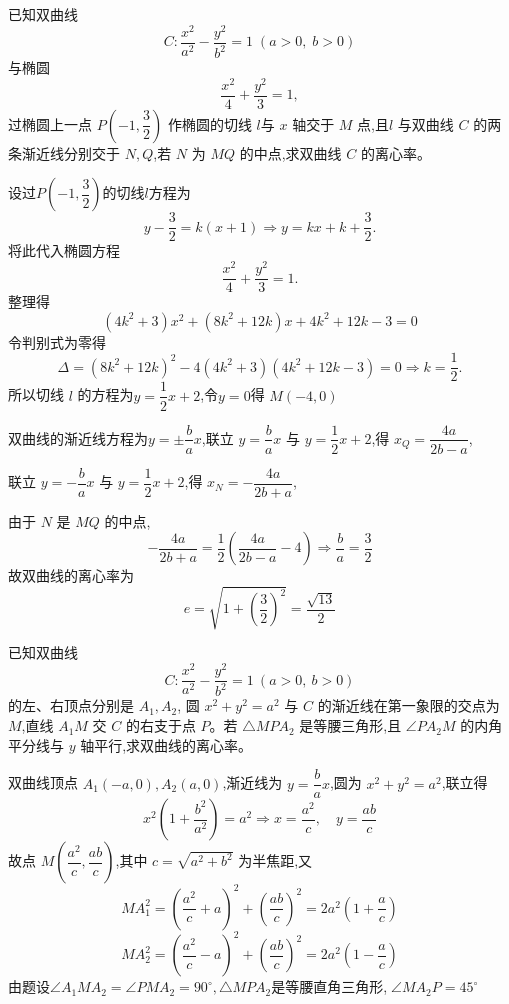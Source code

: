 \begin{questions}
    \question 已知双曲线 
    \[
    C: \frac{x^{2}}{a^{2}} - \frac{y^{2}}{b^{2}} = 1 \; (a>0,\; b>0)
    \]
    与椭圆
    \[
    \frac{x^{2}}{4} + \frac{y^{2}}{3} = 1,
    \]
    过椭圆上一点 $P\left(-1,\dfrac{3}{2}\right)$ 作椭圆的切线 $l$与 $x$ 轴交于 $M$ 点,且$l$ 与双曲线 $C$ 的两条渐近线分别交于 $N,Q$,若 $N$ 为 $MQ$ 的中点,求双曲线 $C$ 的离心率。
    \begin{solution}
        设过$P(-1,\dfrac{3}{2})$的切线$l$方程为
        \[
        y - \frac{3}{2} = k(x + 1)
        \Rightarrow y = kx + k + \frac{3}{2}.
        \]
        将此代入椭圆方程
        \[
        \frac{x^{2}}{4} + \frac{y^{2}}{3} = 1.
        \]
        整理得
        \[
        (4k^2+3)x^2+(8k^2+12k)x+4k^2+12k-3=0
        \]
        令判别式为零得
        \[
        \Delta = (8k^2+12k)^2-4(4k^2+3)(4k^2+12k-3)=0\Rightarrow k = \frac{1}{2}.
        \]
        所以切线 $l$ 的方程为$y = \dfrac{1}{2}x + 2$,令$y = 0$得 $M(-4, 0)$
        
        双曲线的渐近线方程为$y = \pm \dfrac{b}{a}x$,联立 $y = \dfrac{b}{a}x$ 与 $y = \dfrac{1}{2}x + 2$,得 $x_Q = \dfrac{4a}{2b - a}$,
        
        联立 $y = -\dfrac{b}{a}x$ 与 $y = \dfrac{1}{2}x + 2$,得
        $x_N = -\dfrac{4a}{2b + a}$,
        
        由于 $N$ 是 $MQ$ 的中点,
        \[
        -\frac{4a}{2b + a} = \frac{1}{2} \left( \frac{4a}{2b - a} - 4 \right) \Rightarrow\frac{b}{a} = \frac{3}{2}
        \]
        故双曲线的离心率为
        \[
        e = \sqrt{1 + \left( \frac{3}{2} \right)^2 } = \frac{\sqrt{13}}{2}
        \]
    \end{solution}

    \question 已知双曲线 
    \[
    C:\dfrac{x^{2}}{a^{2}} - \dfrac{y^{2}}{b^{2}} = 1\ (a>0,\ b>0)
    \]
    的左、右顶点分别是 $A_1,A_2$,  圆 $x^2 + y^2 = a^2$ 与 $C$ 的渐近线在第一象限的交点为 $M$,直线 $A_1M$ 交 $C$ 的右支于点 $P$。若 $\triangle MPA_2$ 是等腰三角形,且 $\angle PA_2M$ 的内角平分线与 $y$ 轴平行,求双曲线的离心率。
    \begin{solution}
        双曲线顶点 $A_1(-a, 0), A_2(a, 0)$,渐近线为 $y = \dfrac{b}{a}x$,圆为 $x^2 + y^2 = a^2$,联立得
        \[
        x^2\left(1 + \frac{b^2}{a^2}\right) = a^2 \Rightarrow x = \frac{a^2}{c}, \quad y = \frac{ab}{c}
        \]
        故点 $M\left( \dfrac{a^2}{c}, \dfrac{ab}{c} \right)$,其中 $c = \sqrt{a^2 + b^2}$ 为半焦距,又
        \[
        MA_1^2 = \left(\frac{a^2}{c} + a\right)^2 + \left( \frac{ab}{c} \right)^2 = 2a^2\left(1 + \frac{a}{c}\right)
        \]
        \[
        MA_2^2 = \left(\frac{a^2}{c} - a\right)^2 + \left( \frac{ab}{c} \right)^2 = 2a^2\left(1 - \frac{a}{c}\right)
        \]
        由题设$\angle A_{1}MA_{2}=\angle PMA_{2}=90^{\circ},\triangle MPA_{2}$是等腰直角三角形,$\;\angle MA_{2}P=45^{\circ}$
        

\end{solution}
\end{questions}
